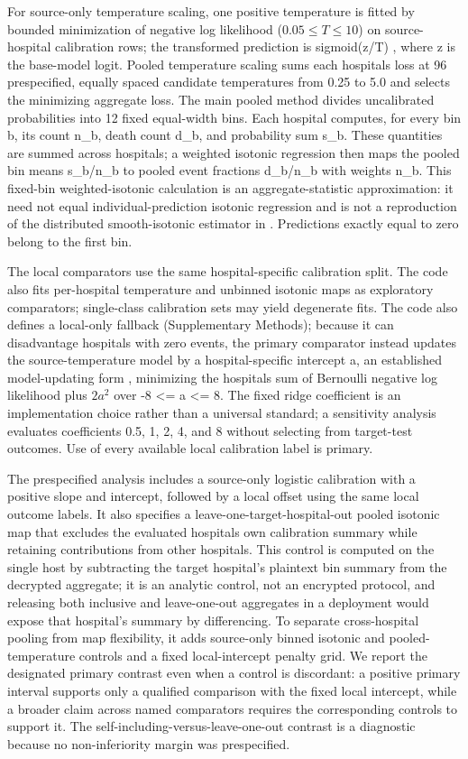 \documentclass[11pt]{article}
\begin{document}
For source-only temperature scaling, one positive temperature is fitted by bounded minimization of negative log likelihood ($0.05\le T\le 10$) on source-hospital calibration rows; the transformed prediction is sigmoid(z/T) \cite{r15}, where z is the base-model logit. Pooled temperature scaling sums each hospital\textquotesingle s loss at 96 prespecified, equally spaced candidate temperatures from 0.25 to 5.0 and selects the minimizing aggregate loss. The main pooled method divides uncalibrated probabilities into 12 fixed equal-width bins. Each hospital computes, for every bin b, its count n\_b, death count d\_b, and probability sum s\_b. These quantities are summed across hospitals; a weighted isotonic regression then maps the pooled bin means s\_b/n\_b to pooled event fractions d\_b/n\_b with weights n\_b. This fixed-bin weighted-isotonic calculation is an aggregate-statistic approximation: it need not equal individual-prediction isotonic regression and is not a reproduction of the distributed smooth-isotonic estimator in \cite{r4}. Predictions exactly equal to zero belong to the first bin.

The local comparators use the same hospital-specific calibration split. The code also fits per-hospital temperature and unbinned isotonic maps as exploratory comparators; single-class calibration sets may yield degenerate fits. The code also defines a local-only fallback (Supplementary Methods); because it can disadvantage hospitals with zero events, the primary comparator instead updates the source-temperature model by a hospital-specific intercept a, an established model-updating form \cite{r17}, minimizing the hospital\textquotesingle s sum of Bernoulli negative log likelihood plus $2a^2$ over -8 \textless= a \textless= 8. The fixed ridge coefficient is an implementation choice rather than a universal standard; a sensitivity analysis evaluates coefficients 0.5, 1, 2, 4, and 8 without selecting from target-test outcomes. Use of every available local calibration label is primary.

The prespecified analysis includes a source-only logistic calibration with a positive slope and intercept, followed by a local offset using the same local outcome labels. It also specifies a leave-one-target-hospital-out pooled isotonic map that excludes the evaluated hospital\textquotesingle s own calibration summary while retaining contributions from other hospitals. This control is computed on the single host by subtracting the target hospital's plaintext bin summary from the decrypted aggregate; it is an analytic control, not an encrypted protocol, and releasing both inclusive and leave-one-out aggregates in a deployment would expose that hospital's summary by differencing. To separate cross-hospital pooling from map flexibility, it adds source-only binned isotonic and pooled-temperature controls and a fixed local-intercept penalty grid. We report the designated primary contrast even when a control is discordant: a positive primary interval supports only a qualified comparison with the fixed local intercept, while a broader claim across named comparators requires the corresponding controls to support it. The self-including-versus-leave-one-out contrast is a diagnostic because no non-inferiority margin was prespecified.
\end{document}
